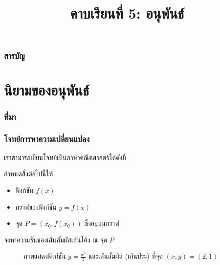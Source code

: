 \title{คาบเรียนที่ 5: อนุพันธ์}
\frame{\titlepage}


\begin{frame}
\frametitle{สารบัญ}
\tableofcontents
\end{frame}

\section{นิยามของอนุพันธ์}
\frame{\sectionpage}

\begin{frame}
\frametitle{ที่มา}
\end{frame}

\begin{frame}[t]
\frametitle{โจทย์การหาความเปลี่ยนแปลง}
เราสามารถเขียนโจทย์เป็นภาษาคณิตศาสตร์ได้ดังนี้
\begin{slide}
\begin{remark}{}
กำหนดสิ่งต่อไปนี้ให้
\begin{itemize}
\item ฟังก์ชัน $f(x)$ 
\item กราฟของฟังก์ชัน $y=f(x)$
\item จุด $P = (x_0, f(x_0))$ ซึ่งอยู่บนกราฟ
\end{itemize}

จงหาความชันของเส้นสัมผัสเส้นโค้ง ณ จุด $P$
\end{remark}
\end{slide}
\end{frame}

\begin{frame}

\begin{figure}[h!]
\centering
{}
\caption{ภาพแสดงฟังก์ชัน $y=\frac{x^2}{4}$ และเส้นสัมผัส (เส้นประ) ที่จุด $(x,y) = (2,1)$}
\end{figure}
\end{frame}

